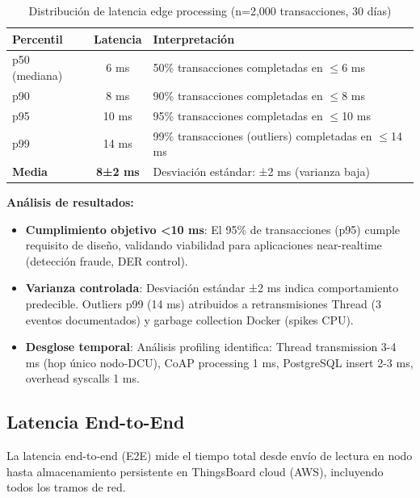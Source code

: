 \begin{table}[H]
\centering
\caption{Distribución de latencia edge processing (n=2,000 transacciones, 30 días)}
\label{tab:latencia-edge-percentiles}
\begin{tabular}{|l|c|p{7cm}|}
\hline
\rowcolor{gray!20}
\textbf{Percentil} & \textbf{Latencia} & \textbf{Interpretación} \\
\hline
p50 (mediana) & 6 ms & 50\% transacciones completadas en $\leq$6 ms \\
\hline
p90 & 8 ms & 90\% transacciones completadas en $\leq$8 ms \\
\hline
p95 & 10 ms & 95\% transacciones completadas en $\leq$10 ms \\
\hline
p99 & 14 ms & 99\% transacciones (outliers) completadas en $\leq$14 ms \\
\hline
\rowcolor{green!20}
\textbf{Media} & \textbf{8±2 ms} & Desviación estándar: ±2 ms (varianza baja) \\
\hline
\end{tabular}
\end{table}

\textbf{Análisis de resultados:}

\begin{itemize}
    \item \textbf{Cumplimiento objetivo <10 ms}: El 95\% de transacciones (p95) cumple requisito de diseño, validando viabilidad para aplicaciones near-realtime (detección fraude, DER control).
    
    \item \textbf{Varianza controlada}: Desviación estándar ±2 ms indica comportamiento predecible. Outliers p99 (14 ms) atribuidos a retransmisiones Thread (3 eventos documentados) y garbage collection Docker (spikes CPU).
    
    \item \textbf{Desglose temporal}: Análisis profiling identifica: Thread transmission 3-4 ms (hop único nodo-DCU), CoAP processing 1 ms, PostgreSQL insert 2-3 ms, overhead syscalls 1 ms.
\end{itemize}

\subsection{Latencia End-to-End}
\label{sec:res-latencia-e2e}

La latencia end-to-end (E2E) mide el tiempo total desde envío de lectura en nodo hasta almacenamiento persistente en ThingsBoard cloud (AWS), incluyendo todos los tramos de red.

